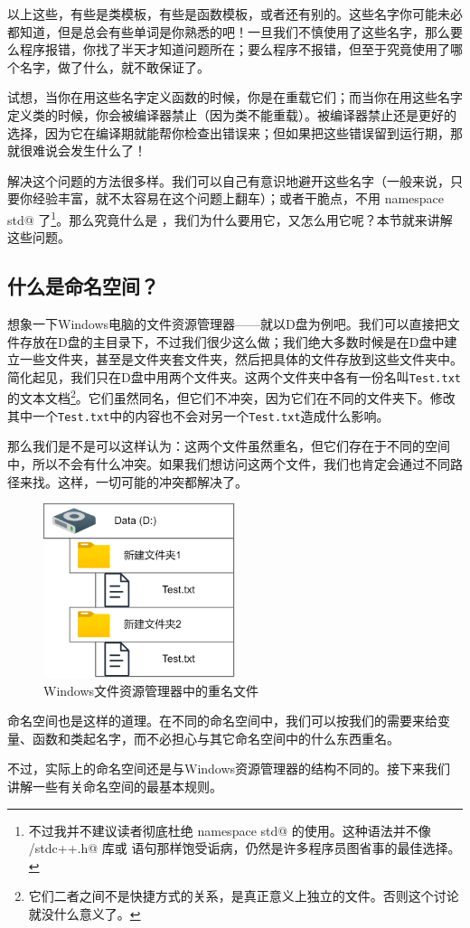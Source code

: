 以上这些，有些是类模板，有些是函数模板，或者还有别的。这些名字你可能未必都知道，但是总会有些单词是你熟悉的吧！一旦我们不慎使用了这些名字，那么要么程序报错，你找了半天才知道问题所在；要么程序不报错，但至于究竟使用了哪个名字，做了什么，就不敢保证了。\par
试想，当你在用这些名字定义函数的时候，你是在重载它们；而当你在用这些名字定义类的时候，你会被编译器禁止（因为类不能重载）。被编译器禁止还是更好的选择，因为它在编译期就能帮你检查出错误来；但如果把这些错误留到运行期，那就很难说会发生什么了！\par
解决这个问题的方法很多样。我们可以自己有意识地避开这些名字（一般来说，只要你经验丰富，就不太容易在这个问题上翻车）；或者干脆点，不用 \lstinline@using namespace std@ 了\footnote{不过我并不建议读者彻底杜绝 \lstinline@using namespace std@ 的使用。这种语法并不像 \lstinline@bits/stdc++.h@ 库或 \lstinline@goto@ 语句那样饱受诟病，仍然是许多程序员图省事的最佳选择。}。那么究竟什么是 \lstinline@namespace@，我们为什么要用它，又怎么用它呢？本节就来讲解这些问题。\par
\subsection*{什么是命名空间？}
想象一下Windows电脑的文件资源管理器——就以D盘为例吧。我们可以直接把文件存放在D盘的主目录下，不过我们很少这么做；我们绝大多数时候是在D盘中建立一些文件夹，甚至是文件夹套文件夹，然后把具体的文件存放到这些文件夹中。简化起见，我们只在D盘中用两个文件夹。这两个文件夹中各有一份名叫\texttt{Test.txt}的文本文档\footnote{它们二者之间不是快捷方式的关系，是真正意义上独立的文件。否则这个讨论就没什么意义了。}。它们虽然同名，但它们不冲突，因为它们在不同的文件夹下。修改其中一个\texttt{Test.txt}中的内容也不会对另一个\texttt{Test.txt}造成什么影响。\par
那么我们是不是可以这样认为：这两个文件虽然重名，但它们存在于不同的空间中，所以不会有什么冲突。如果我们想访问这两个文件，我们也肯定会通过不同路径来找。这样，一切可能的冲突都解决了。\par
\begin{figure}[htbp]
    \centering
    \includegraphics[width=0.5\textwidth]{../images/generalized_parts/07_file_explorer_and_namespaces.png}
    \caption{Windows文件资源管理器中的重名文件}
\end{figure}
命名空间也是这样的道理。在不同的命名空间中，我们可以按我们的需要来给变量、函数和类起名字，而不必担心与其它命名空间中的什么东西重名。\par
不过，实际上的命名空间还是与Windows资源管理器的结构不同的。接下来我们讲解一些有关命名空间的最基本规则。\par
